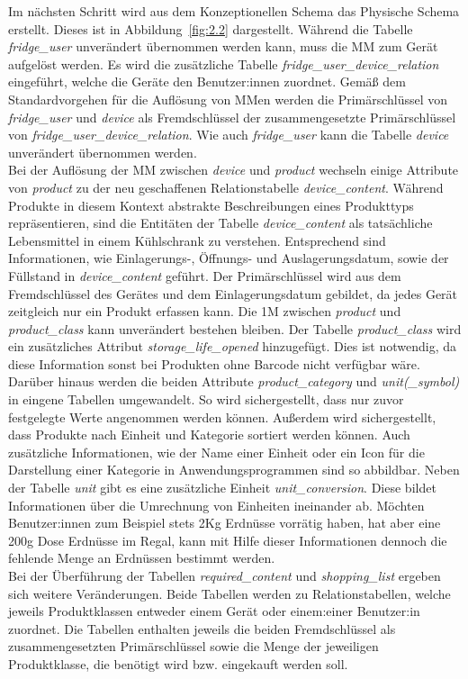Im nächsten Schritt wird aus dem Konzeptionellen Schema das Physische Schema erstellt. Dieses ist in Abbildung~\ref{fig:2.2} dargestellt. Während die Tabelle \textit{fridge\_user} unverändert übernommen werden kann, muss die \gls{MM} zum Gerät aufgelöst werden. Es wird die zusätzliche Tabelle \textit{fridge\_user\_device\_relation} eingeführt, welche die Geräte den Benutzer:innen zuordnet. Gemäß dem Standardvorgehen für die Auflösung von \gls{MM}en werden die Primärschlüssel von \textit{fridge\_user} und \textit{device} als Fremdschlüssel der zusammengesetzte Primärschlüssel von \textit{fridge\_user\_device\_relation}. Wie auch \textit{fridge\_user} kann die Tabelle \textit{device} unverändert übernommen werden.\\ Bei der Auflösung der \gls{MM} zwischen \textit{device} und \textit{product} wechseln einige Attribute von \textit{product} zu der neu geschaffenen Relationstabelle \textit{device\_content}. Während Produkte in diesem Kontext abstrakte Beschreibungen eines Produkttyps repräsentieren, sind die Entitäten der Tabelle \textit{device\_content} als tatsächliche Lebensmittel in einem Kühlschrank zu verstehen. Entsprechend sind Informationen, wie Einlagerungs-, Öffnungs- und Auslagerungsdatum, sowie der Füllstand in \textit{device\_content} geführt. Der Primärschlüssel wird aus dem Fremdschlüssel des Gerätes und dem Einlagerungsdatum gebildet, da jedes Gerät zeitgleich nur ein Produkt erfassen kann.
Die \gls{1M} zwischen \textit{product} und \textit{product\_class} kann unverändert bestehen bleiben. Der Tabelle \textit{product\_class} wird ein zusätzliches Attribut \textit{storage\_life\_opened} hinzugefügt. Dies ist notwendig, da diese Information sonst bei Produkten ohne Barcode nicht verfügbar wäre. Darüber hinaus werden die beiden Attribute \textit{product\_category} und \textit{unit(\_symbol)} in eingene Tabellen umgewandelt. So wird sichergestellt, dass nur zuvor festgelegte Werte angenommen werden können. Außerdem wird sichergestellt, dass Produkte nach Einheit und Kategorie sortiert werden können. Auch zusätzliche Informationen, wie der Name einer Einheit oder ein Icon für die Darstellung einer Kategorie in Anwendungsprogrammen sind so abbildbar. Neben der Tabelle \textit{unit} gibt es eine zusätzliche Einheit \textit{unit\_conversion}. Diese bildet Informationen über die Umrechnung von Einheiten ineinander ab. Möchten Benutzer:innen zum Beispiel stets 2Kg Erdnüsse vorrätig haben, hat aber eine 200g Dose Erdnüsse im Regal, kann mit Hilfe dieser Informationen dennoch die fehlende Menge an Erdnüssen bestimmt werden.\\ Bei der Überführung der Tabellen \textit{required\_content} und \textit{shopping\_list} ergeben sich weitere Veränderungen. Beide Tabellen werden zu Relationstabellen, welche jeweils Produktklassen entweder einem Gerät oder einem:einer Benutzer:in zuordnet. Die Tabellen enthalten jeweils die beiden Fremdschlüssel als zusammengesetzten Primärschlüssel sowie die Menge der jeweiligen Produktklasse, die benötigt wird bzw. eingekauft werden soll.

